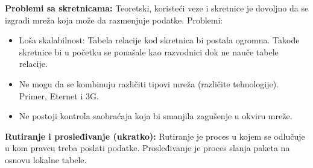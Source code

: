 \documentclass[a4paper]{article}
\begin{document}
    \textbf{Problemi sa skretnicama:} Teoretski, koristeći veze i skretnice je dovoljno da se izgradi
    mreža koja može da razmenjuje podatke. Problemi:
    \begin{itemize}
        \item Loša skalabilnost: Tabela relacije kod skretnica bi postala ogromna. Takođe skretnice
              bi u početku se ponašale kao razvodnici dok ne nauče tabele relacije.
        \item Ne mogu da se kombinuju različiti tipovi mreža (različite tehnologije). Primer, Eternet
              i 3G.
        \item Ne postoji kontrola saobraćaja koja bi smanjila zagušenje u okviru mreže.
    \end{itemize}

    \textbf{Rutiranje i prosleđivanje (ukratko):} Rutiranje je proces u kojem se odlučuje u 
    kom pravcu treba poslati podatke. Prosleđivanje je proces slanja paketa na osnovu 
    lokalne tabele. \\
    
\end{document}
